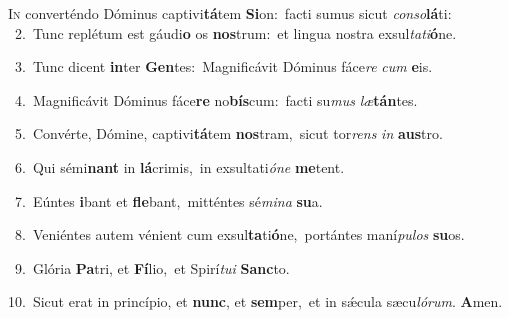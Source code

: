 \lettrine{\initial\textcolor{\initialcolor}{I}}{n} converténdo Dóminus captivi\-\textbf{tá}\-tem \textbf{Si}\-on:~\star facti sumus sicut \textit{con}\-\textit{so}\textbf{lá}ti:\\
{\numbfont\textcolor{\numbcolor}{~2.}}~Tunc replétum est gáudi\textbf{o} os \textbf{nos}\-trum:~\star et lingua nostra exsul\-\textit{ta}\-\textit{ti}\textbf{ó}ne.\par
{\numbfont\textcolor{\numbcolor}{~3.}}~Tunc dicent \textbf{in}\-ter \textbf{Gen}\-tes:~\star Magnificávit Dóminus fáce\textit{re} \textit{cum} \textbf{e}\-is.\par
{\numbfont\textcolor{\numbcolor}{~4.}}~Magnificávit Dóminus fáce\textbf{re} no\-\textbf{bís}\-cum:~\star facti su\textit{mus} \textit{læ}\-\textbf{tán}tes.\par
{\numbfont\textcolor{\numbcolor}{~5.}}~Convérte, Dómine, captivi\-\textbf{tá}\-tem \textbf{nos}\-tram,~\star sicut tor\textit{rens} \textit{in} \textbf{aus}\-tro.\par
{\numbfont\textcolor{\numbcolor}{~6.}}~Qui sémi\textbf{nant} in \textbf{lá}\-crimis,~\star in exsultati\-\textit{ó}\-\textit{ne} \textbf{me}\-tent.\par
{\numbfont\textcolor{\numbcolor}{~7.}}~Eúntes \textbf{i}\-bant et \textbf{fle}\-bant,~\star mitténtes sé\-\textit{mi}\-\textit{na} \textbf{su}\-a.\par
{\numbfont\textcolor{\numbcolor}{~8.}}~Veniéntes autem vénient cum exsul\-\textbf{ta}\-ti\-\textbf{ó}\-ne,~\star portántes maní\-\textit{pu}\-\textit{los} \textbf{su}\-os.\par
{\numbfont\textcolor{\numbcolor}{~9.}}~Glória \textbf{Pa}\-tri, et \textbf{Fí}\-lio,~\star et Spirí\-\textit{tu}\-\textit{i} \textbf{Sanc}\-to.\par
{\numbfont\textcolor{\numbcolor}{10.}}~Sicut erat in princípio, et \textbf{nunc}\-, et \textbf{sem}\-per,~\star et in sǽcula sæcu\-\textit{ló}\-\textit{rum}. \textbf{A}\-men.\par
